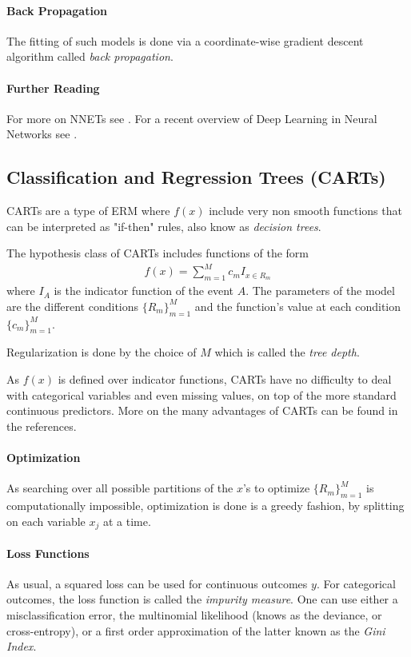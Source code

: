 \documentclass[12pt,a4paper]{article}
\theoremstyle{plain}
\theoremstyle{definition}
\newcommand{\hyp}{f}
\begin{document}
\paragraph{Back Propagation}
The fitting of such models is done via a coordinate-wise gradient descent algorithm called \emph{back propagation}.

\paragraph{Further Reading}
For more on NNETs see \citep[Chapter 11]{hastie_elements_2003}.
For a recent overview of Deep Learning in Neural Networks see \cite{schmidhuber_deep_2015}.




\subsection{Classification and Regression Trees (CARTs)}
CARTs are a type of ERM where $\hyp(x)$ include very non smooth functions that can be interpreted as "if-then" rules, also know as \emph{decision trees}.

The hypothesis class of CARTs includes functions of the form
\begin{align}
	\hyp(x)=\sum_{m=1}^M c_m I_{x \in R_m}
\end{align}
where $I_A$ is the indicator function of the event $A$.
The parameters of the model are the different conditions $\{R_m\}_{m=1}^M$ and the function's value at each condition $\{c_m\}_{m=1}^M$. 

Regularization is done by the choice of $M$ which is called the \emph{tree depth}.

As $\hyp(x)$ is defined over indicator functions, CARTs have no difficulty to deal with categorical variables and even missing values, on top of the more standard continuous predictors. More on the many advantages of CARTs can be found in the references.

\paragraph{Optimization}
As searching over all possible partitions of the $x$'s to optimize $\{R_m\}_{m=1}^M$ is computationally impossible, optimization is done is a greedy fashion, by splitting on each variable $x_j$ at a time.


\paragraph{Loss Functions}
As usual, a squared loss can be used for continuous outcomes $y$.
For categorical outcomes, the loss function is called the \emph{impurity measure}.
One can use either a misclassification error, the multinomial likelihood (knows as the deviance, or cross-entropy), or a first order approximation of the latter known as the \emph{Gini Index}.
\end{document}
